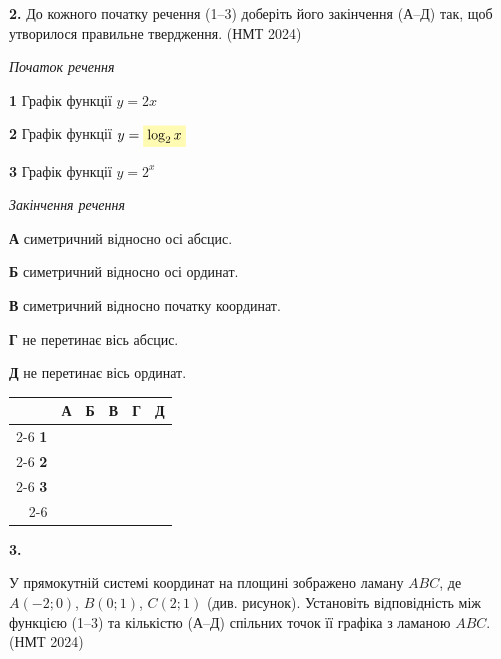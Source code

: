 \documentclass[14pt]{extarticle}
\newcommand{\answerGridSmall}{
    \begingroup
    \renewcommand{\arraystretch}{1.2} 
    \setlength{\tabcolsep}{5pt} 
    \begin{tabular}{r|c|c|c|c|c|}
         \multicolumn{1}{c}{} & \multicolumn{1}{c}{\textbf{А}} & \multicolumn{1}{c}{\textbf{Б}} & \multicolumn{1}{c}{\textbf{В}} & \multicolumn{1}{c}{\textbf{Г}} & \multicolumn{1}{c}{\textbf{Д}} \\ \cline{2-6}
         \textbf{1} & & & & & \\ \cline{2-6}
         \textbf{2} & & & & & \\ \cline{2-6}
         \textbf{3} & & & & & \\ \cline{2-6}
    \end{tabular}
    \endgroup
}
\newcommand{\matchingLayoutBottom}[2]{
    \noindent
    \begin{minipage}[t]{0.48\textwidth}
        #1
    \end{minipage}%
    \hfill
    \begin{minipage}[t]{0.48\textwidth}
        #2
    \end{minipage}
    
    \vspace{0.5cm}
    
    \noindent
    \answerGridSmall
}
\newcommand{\nmtyear}[1]{\hfill{\small\color{yearcolor}(НМТ #1)}}
\begin{document}
\vspace{1cm}

\noindent\textbf{2.} До кожного початку речення (1--3) доберіть його закінчення (А--Д) так, щоб утворилося правильне твердження. \nmtyear{2024}
\vspace{0.3cm}

\matchingLayoutBottom{\textit{Початок речення}

\textbf{1} \quad Графік функції $y = 2x$

\textbf{2} \quad Графік функції $y = \colorbox{yellow!30}{$\log_2 x$}$

\textbf{3} \quad Графік функції $y = 2^x$
}{
\textit{Закінчення речення}

\textbf{А} \quad симетричний відносно осі абсцис.

\textbf{Б} \quad симетричний відносно осі ординат.

\textbf{В} \quad симетричний відносно початку координат.

\textbf{Г} \quad не перетинає вісь абсцис.

\textbf{Д} \quad не перетинає вісь ординат.
}

\vspace{1cm}

\noindent\textbf{3.} \begin{minipage}[t]{0.55\textwidth}
У прямокутній системі координат на площині зображено ламану $ABC$, де $A(-2; 0)$, $B(0; 1)$, $C(2; 1)$ (див. рисунок). Установіть відповідність між функцією (1--3) та кількістю (А--Д) спільних точок її графіка з ламаною $ABC$. \nmtyear{2024}
\end{minipage}
\hfill
\begin{minipage}[t]{0.4\textwidth}
    \vspace{-0.5cm}
    \begin{flushright}
    \end{flushright}
\end{minipage}
\end{document}
